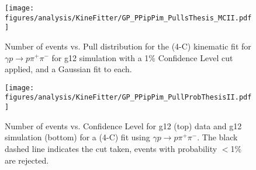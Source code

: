 %
%
\begin{figure}[h!]\begin{center}
\texttt{[image: \\figures/analysis/KineFitter/GP\_PPipPim\_PullsThesis\_MCII.pdf]}
\caption[Number of events vs. Pull distribution for the (4-C) kinematic fit for $\gamma p \rightarrow p \pi^+ \pi^-$ for g12 simulation with a 1\% Confidence Level cut applied, and a Gaussian fit to each]{\label{fig:kinfit.PiPullMC}Number of events vs. Pull distribution for the (4-C) kinematic fit for $\gamma p \rightarrow p \pi^+ \pi^-$ for g12 simulation with a 1\% Confidence Level cut applied, and a Gaussian fit to each.}
\end{center}\end{figure}
%
%
\begin{figure}[h!]\begin{center}
\texttt{[image: \\figures/analysis/KineFitter/GP\_PPipPim\_PullProbThesisII.pdf]}
\caption[Number of events vs. Confidence Level for g12 (top) data and g12 simulation (bottom) for a (4-C) fit using $\gamma p \rightarrow p \pi^+ \pi^-$]{\label{fig:kinfit.PiPullProb}Number of events vs. Confidence Level for g12 (top) data and g12 simulation (bottom) for a (4-C) fit using $\gamma p \rightarrow p \pi^+ \pi^-$. The black dashed line indicates the cut taken, events with probability $<$1\% are rejected.}
\end{center}\end{figure}
%
%
\FloatBarrier
